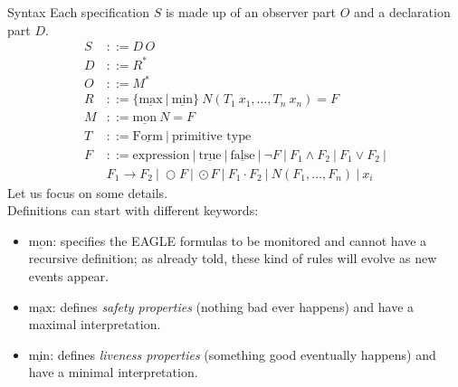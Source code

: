 \documentclass[aspectratio=169,t,xcolor=table]{beamer}
\begin{document}
\begin{frame}[allowframebreaks]{Syntax}
    Each specification $S$ is made up of an observer part $O$ and a declaration part $D$.
    \begin{align*}
    S &::= D \, O \\
    D &::= R^* \\
    O &::= M^* \\
    R &::= \{\underline{\text{max}}\ |\ \underline{\text{min}} \}\ N(T_1\ x_1, \ldots, T_n\ x_n) = F \\
    M &::= \underline{\text{mon}}\ N = F \\
    T &::= \underline{\text{Form}}\ |\ \text{primitive type} \\
    F &::= \text{expression}\ |\ \underline{\text{true}}\ |\ \underline{\text{false}}\ |\ \neg F\ |\ F_1 \land F_2\ |\ F_1 \lor F_2\ |\\
            &F_1 \rightarrow F_2\ |\ \bigcirc F\ |\ \odot F\ |\ F_1 \cdot F_2\ |\ N(F_1, \ldots, F_n)\ |\ x_i
    \end{align*}
    Let us focus on some details.\\
    Definitions can start with different keywords:
    \begin{itemize}
        \item $\underline{\text{mon}}$: specifies the EAGLE formulas to be monitored and cannot have a recursive definition; as already told, these kind of rules will evolve as new events appear.
        \item $\underline{\text{max}}$: defines \textit{safety properties} (nothing bad ever happens) and have a maximal interpretation.
        \item $\underline{\text{min}}$: defines \textit{liveness properties} (something good eventually happens) and have a minimal interpretation.
    \end{itemize}


\end{frame}
\end{document}
